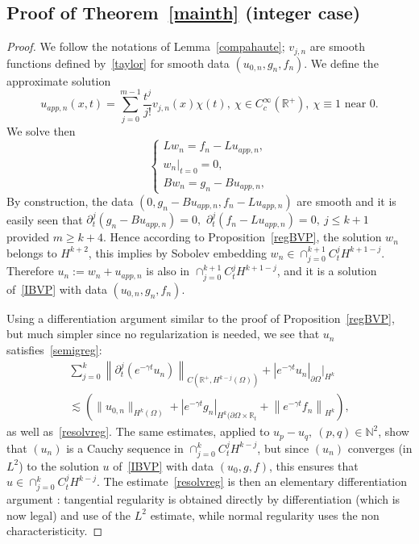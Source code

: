 \documentclass[AHL,Unicode,longabstracts,published]{cedram}
\newcommand{\R}{\mathbb{R}}
\newcommand{\N}{\mathbb{N}}
\newcommand{\N}{\mathbb{N}}
\begin{document}
\subsection{Proof of Theorem~\ref{mainth} (integer case)}
\begin{proof}
We follow the notations of Lemma~\ref{compahaute}; $v_{j,n}$ are smooth functions defined by~\eqref{taylor} for smooth data $(u_{0,n},g_n,f_n)$. We define the approximate solution
\[
u_{app,n}(x,t)=\sum_{j=0}^{m-1}\frac{t^j}{j!} v_{j,n}(x)\chi(t),\ \chi\in C_c^\infty (\R^+),\ \chi\equiv 1\text{ near 0}.
\]
We solve then
\[
\left\{
\begin{array}{ll}
Lw_n=f_n-Lu_{app,n},\\
w_n|_{t=0}=0,\\
Bw_n=g_n-Bu_{app,n},
\end{array}
\right.
\]
By construction, the data $(0,g_n-Bu_{app,n},f_n-Lu_{app,n})$ are smooth and it is easily seen that $\partial_t^j(g_n-Bu_{app,n})=0,$ $\partial_t^j(f_n-Lu_{app,n})=0,\ j\leq k+1$ provided $m\geq k+4$. Hence according to Proposition~\ref{regBVP}, the solution $w_n$ belongs to $H^{k+2}$, this implies by Sobolev embedding $w_n\in\cap_{j=0}^{k+1}C_t^jH^{k+1-j}$. Therefore $u_n:=w_n+u_{app,n}$ is also in $\cap_{j=0}^{k+1}C_t^jH^{k+1-j}$, and it is a solution of~\eqref{IBVP} with data $(u_{0,n},g_n,f_n)$.


Using a differentiation argument similar to the proof of Proposition~\ref{regBVP}, but much simpler since no regularization is needed, we see that $u_n$ satisfies~\eqref{semigreg}:
\begin{multline*}
\sum_{j=0}^k \left\|\partial_t^j\left(e^{-\gamma t}u_n\right)\right\|_{C\left(\R^+,H^{k-j}(\Omega)\right)}+ \left|e^{-\gamma t}u_n\right|_{\partial\Omega}|_{H^k}\\
\lesssim \left(\|u_{0,n}\|_{H^k(\Omega)}+ \left|e^{-\gamma t}g_n\right|_{H^k(\partial\Omega\times \R_t}
+\left\|e^{-\gamma t}f_n\right\|_{H^k}\right),
\end{multline*}
as well as~\eqref{resolvreg}. The same estimates, applied to $u_p-u_q,\ (p,q)\in \N^2$, show that $(u_n)$ is a Cauchy sequence in $\cap_{j=0}^kC_t^jH^{k-j}$, but since $(u_n)$ converges (in $L^2$) to the solution $u$ of~\eqref{IBVP} with data $(u_0,g,f)$, this ensures that $u\in
\cap_{j=0}^kC_t^jH^{k-j}$. The estimate~\eqref{resolvreg} is then an elementary differentiation argument : tangential regularity is obtained directly by differentiation (which is now legal) and use of the $L^2$ estimate, while normal regularity uses the non characteristicity.


\end{proof}
\end{document}
